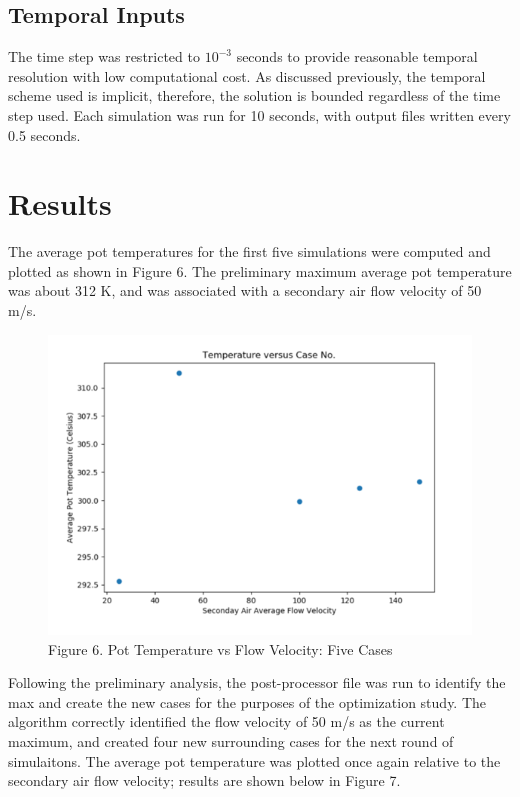 \documentclass[3p,times,twocolumn]{elsarticle}
\begin{document}
\subsection{Temporal Inputs}
The time step was restricted to $10^{-3}$ seconds to provide reasonable temporal resolution with low computational cost. As discussed previously, the temporal scheme used is implicit, therefore, the solution is bounded regardless of the time step used. Each simulation was run for 10 seconds, with output files written every 0.5 seconds.

\section{Results}
The average pot temperatures for the first five simulations were computed and plotted as shown in Figure 6. The preliminary maximum average pot temperature was about 312 K, and was associated with a secondary air flow velocity of 50 m/s.

\begin{figure}{\linewidth}
	\includegraphics[width=\linewidth]{prelim.png}
	\caption{Figure 6. Pot Temperature vs Flow Velocity: Five Cases}
\end{figure}


Following the preliminary analysis, the post-processor file was run to identify the max and create the new cases for the purposes of the optimization study. The algorithm correctly identified the flow velocity of 50 m/s as the current maximum, and created four new surrounding cases for the next round of simulaitons. The average pot temperature was plotted once again relative to the secondary air flow velocity; results are shown below in Figure 7.
\end{document}

